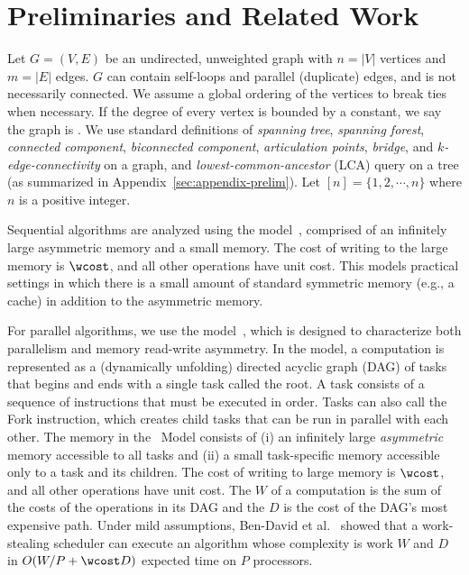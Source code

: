 \section{Preliminaries and Related Work}

Let $G=(V, E)$ be an undirected, unweighted graph with $n = |V|$ vertices
and $m = |E|$ edges.
$G$ can contain self-loops and parallel (duplicate) edges, and is not necessarily connected.
We assume a global ordering of the vertices to break ties when necessary.
If the degree of every vertex is bounded by a constant, we say the graph
is .
%
We use standard definitions of \emph{spanning tree}, \emph{spanning
  forest}, \emph{connected component}, \emph{biconnected component},
\emph{articulation points}, \emph{bridge}, and
\emph{$k$-edge-connectivity} on a graph, and
\emph{lowest-common-ancestor} (LCA) query on a tree (as summarized in
Appendix~\ref{sec:appendix-prelim}).
%
Let $[n] = \{1, 2, \cdots, n\}$ where $n$ is a positive integer.


Sequential algorithms are analyzed using the 
model~\cite{blelloch2016efficient}, comprised of an infinitely large
asymmetric memory and a small \local{} memory.  The cost of writing to
the large memory is $\wcost$, and all other operations have unit cost.
This models practical settings in which there is a small amount of
standard symmetric memory (e.g., a cache) in addition to the asymmetric memory.

For parallel algorithms, we use the  
model~\cite{BBFGGMS16}, which is designed to characterize both parallelism
and memory read-write asymmetry. In the model, a
computation is represented as a (dynamically unfolding) directed acyclic graph (DAG) of tasks that
begins and ends with a single task called the root. A task consists of
a sequence of instructions that must be executed in order. Tasks can
also call the Fork instruction, which creates child tasks that can be
run in parallel with each other. The memory in the \ourmodel\ Model
consists of (i) an infinitely large
\emph{asymmetric} memory accessible to all tasks and (ii) a small
task-specific \emph{\local} memory accessible only to a task
and its children.  The cost of writing to large memory is
$\wcost$, and all other operations have unit cost.
%
The  $W$ of a computation is the sum of the costs of the
operations in its DAG and the  $D$ is the
cost of the DAG's most expensive path.  Under mild assumptions,
Ben-David et al.~\cite{BBFGGMS16} showed that a work-stealing scheduler
can execute an algorithm whose \ourmodel{} complexity is
work $W$ and \depth{} $D$ in $O(W / P + \wcost D)$ expected time
on $P$ processors.


